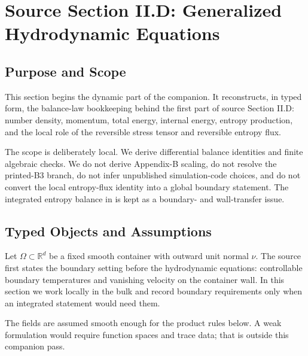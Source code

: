 \section{Source Section II.D: Generalized Hydrodynamic Equations}
\label{sec:hydrodynamic-equations}


\subsection{Purpose and Scope}

This section begins the dynamic part of the companion.  It reconstructs, in
typed form, the balance-law bookkeeping behind the first part of source
Section II.D: number density, momentum, total energy, internal energy, entropy
production, and the local role of the reversible stress tensor and reversible
entropy flux.

The scope is deliberately local.  We derive differential balance identities
and finite algebraic checks.  We do not derive Appendix-B scaling, do not
resolve the printed-B3 branch, do not infer unpublished simulation-code
choices, and do not convert the local entropy-flux identity into a global
boundary statement.  The integrated entropy balance in  is kept as
a boundary- and wall-transfer issue.

\subsection{Typed Objects and Assumptions}

Let \(\Omega\subset\mathbb{R}^d\) be a fixed smooth container with outward
unit normal \(\nu\).  The source first states the boundary setting before the
hydrodynamic equations: controllable boundary temperatures and vanishing
velocity on the container wall.  In this section we work locally in the bulk
and record boundary requirements only when an integrated statement would need
them.

The fields are assumed smooth enough for the product rules below.  A weak
formulation would require function spaces and trace data; that is outside this
companion pass.

